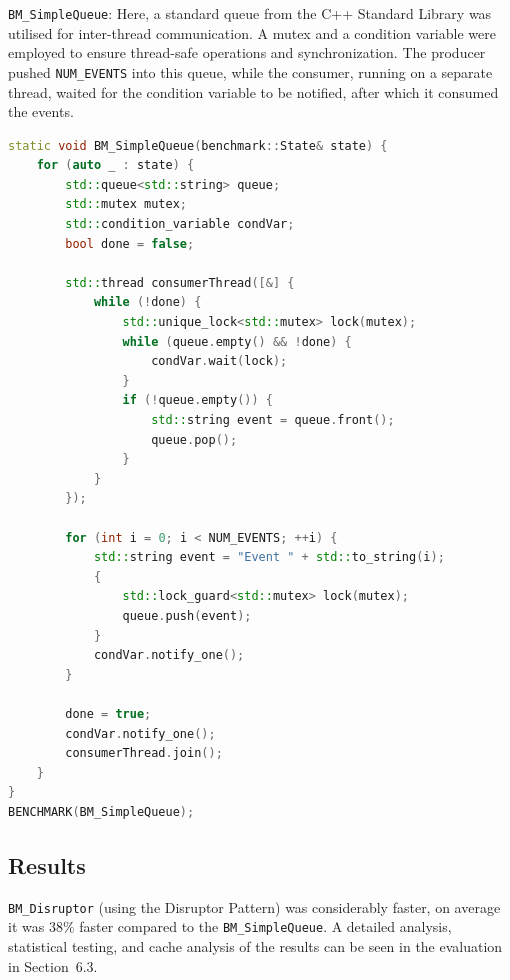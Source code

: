 \documentclass{article}
\theoremstyle{break}
\begin{document}

\texttt{BM\_SimpleQueue}: Here, a standard queue from the C++ Standard Library was utilised for inter-thread communication. A mutex and a condition variable were employed to ensure thread-safe operations and synchronization. The producer pushed \texttt{NUM\_EVENTS} into this queue, while the consumer, running on a separate thread, waited for the condition variable to be notified, after which it consumed the events.


\begin{lstlisting}[style=customc++, language=C++, caption={Simple Queue Google Benchmark}]
static void BM_SimpleQueue(benchmark::State& state) {
    for (auto _ : state) {
        std::queue<std::string> queue; 
        std::mutex mutex;
        std::condition_variable condVar;
        bool done = false;

        std::thread consumerThread([&] {
            while (!done) {
                std::unique_lock<std::mutex> lock(mutex);
                while (queue.empty() && !done) {
                    condVar.wait(lock);
                }
                if (!queue.empty()) {
                    std::string event = queue.front(); 
                    queue.pop();
                }
            }
        });

        for (int i = 0; i < NUM_EVENTS; ++i) {
            std::string event = "Event " + std::to_string(i); 
            {
                std::lock_guard<std::mutex> lock(mutex);
                queue.push(event);
            }
            condVar.notify_one();
        }

        done = true;
        condVar.notify_one();
        consumerThread.join();
    }
}
BENCHMARK(BM_SimpleQueue);
\end{lstlisting}

\subsection{Results}

\texttt{BM\_Disruptor} (using the Disruptor Pattern) was considerably faster, on average it was \(38\%\) faster compared to the \texttt{BM\_SimpleQueue}. A detailed analysis, statistical testing, and cache analysis of the results can be seen in the evaluation in Section~6.3.
\end{document}
